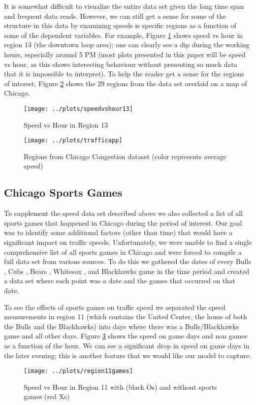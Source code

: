 \documentclass[12pt]{article}
\begin{document}
It is somewhat difficult to visualize the entire data set given the long time span and frequent data reads. However, we can still get a sense for some of the structure in this data by examining speeds is specific regions as a function of some of the dependent variables. For example, Figure \ref{speedvshour13} shows speed vs hour in region 13 (the downtown loop area); one can clearly see a dip during the working hours, especially around 5 PM (most plots presented in this paper will be speed vs hour, as this shows interesting behaviour without presenting so much data that it is impossible to interpret). To help the reader get a sense for the regions of interest, Figure \ref{appscreenshot} shows the 29 regions from the data set overlaid on a map of Chicago.
\begin{figure}[!ht]
\centering
\texttt{[image: ../plots/speedvshour13]}
\caption{Speed vs Hour in Region 13}
\label{speedvshour13}
\end{figure}
\begin{figure}[!ht]
\centering
\texttt{[image: ../plots/trafficapp]}
\caption{Regions from Chicago Congestion dataset (color represents average speed)}
\label{appscreenshot}
\end{figure}
\subsection{Chicago Sports Games}
To supplement the speed data set described above we also collected a list of all sports games that happened in Chicago during the period of interest. Our goal was to identify some additional factors (other than time) that would have a significant impact on traffic speeds. Unfortunately, we were unable to find a single comprehensive list of all sports games in Chicago and were forced to compile a full data set from various sources. To do this we gathered the dates of every Bulls \cite{bullsdata},  Cubs \cite{cubsdata}, Bears \cite{bearsdata}, Whitesox \cite{whitesoxdata}, and Blackhawks \cite{blackhawksdata} game in the time period and created a data set where each point was a date and the games that occurred on that date. 

To see the effects of sports games on traffic speed we separated the speed measurements in region 11 (which contains the United Center, the home of both the Bulls and the Blackhawks) into days where there was a Bulls/Blackhawks game and all other days. Figure \ref{region11games} shows the speed on game days and non games as a function of the hour. We can see a significant drop in speed on game days in the later evening; this is another feature that we would like our model to capture.
\begin{figure}[!ht]
\centering
\texttt{[image: ../plots/region11games]}
\caption{Speed vs Hour in Region 11 with (black Os) and without sports games (red Xs)}
\label{region11games}
\end{figure}
\end{document}
